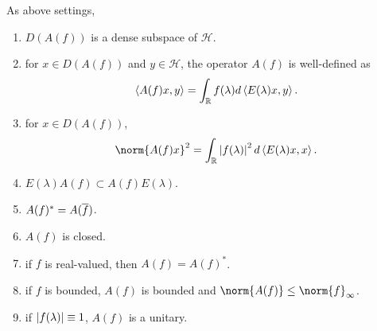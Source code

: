 \documentclass[a4paper,12pt]{article}
\begin{document}
\begin{thm}
    As above settings,
    \begin{enumerate}[label=(\arabic{*})]
        \item $D(A(f))$ is a dense subspace of $\mathcal{H}$.
        \item for $x \in D(A(f))$ and $y \in \mathcal{H}$, the operator $A(f)$ is well-defined as
        \begin{equation*}
            \left\langle A(f)x,y \right\rangle = \int_{\mathbb{R}} f(\lambda) d\left\langle E(\lambda)x,y \right\rangle.
        \end{equation*}
        \item for $x\in D(A(f))$,
        \begin{equation*}
            \norm{A(f)x}^2 = \int_\R \abs{f(\lambda)}^2 d \inn{E(\lambda)x,x}.
        \end{equation*}
        \item $E(\lambda)A(f) \subset A(f)E(\lambda)$.
        \item $A(f)^* = A(\overline{f})$.
        \item $A(f)$ is closed.
        \item if $f$ is real-valued, then $A(f) = A(f)^*$.
        \item if $f$ is bounded, $A(f)$ is bounded and $\norm{A(f)} \leq \norm{f}_{\infty}$.
        \item if $\left\lvert f(\lambda)\right\lvert \equiv 1$, $A(f)$ is a unitary.
    \end{enumerate}
\end{thm}
\end{document}
